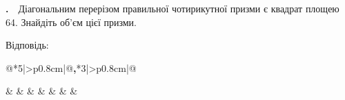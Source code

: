 \documentclass[12pt]{article}
\makeatletter
\newlength{\nmtcellw}
\newcommand{\nmtSetCell}{\setlength{\nmtcellw}{\dimexpr(\linewidth-10\tabcolsep-6\arrayrulewidth)/5\relax}}
\newcommand{\nmtAnswerBox}{%
\par\nopagebreak\vspace{0.2cm}\noindent
Відповідь:\ \
\begin{tabular}{@{}*{4}{|>{\centering\arraybackslash}p{0.8cm}}|@{\hspace{0.1cm}\textbf{,}\hspace{0.1cm}}*{3}{|>{\centering\arraybackslash}p{0.8cm}}|@{}}
\hline
\rule[-0.2cm]{0pt}{0.7cm} & & & & & & \\
\hline
\end{tabular}
\par\vspace{0.3cm}
}
\newcommand{\matchingGrid}{%
    \sbox{\nmtgridbox}{\matchingGridRaw}%
    \ifdim\wd\nmtgridbox>\linewidth \resizebox{\linewidth}{!}{\usebox{\nmtgridbox}}\else\usebox{\nmtgridbox}\fi}
\newcommand{\matchingGridRaw}{%
    \begingroup
    \renewcommand{\arraystretch}{1.15}
    \setlength{\tabcolsep}{4pt}
    \footnotesize
    \begin{tabular}{r|c|c|c|c|c|}
         \multicolumn{1}{c}{} & \multicolumn{1}{c}{\textbf{А}} & \multicolumn{1}{c}{\textbf{Б}} & \multicolumn{1}{c}{\textbf{В}} & \multicolumn{1}{c}{\textbf{Г}} & \multicolumn{1}{c}{\textbf{Д}} \\ \cline{2-6}
         \textbf{1} & \phantom{X} & \phantom{X} & \phantom{X} & \phantom{X} & \phantom{X} \\ \cline{2-6}
         \textbf{2} & & & & & \\ \cline{2-6}
         \textbf{3} & & & & & \\ \cline{2-6}
    \end{tabular}
    \endgroup
}
\newcounter{zad}
\newcommand{\zadnum}{\stepcounter{zad}\textbf{\thezad.}\ \ }
\newcounter{ans}
\newcommand{\nbvspace}[1]{\nopagebreak\vspace{#1}}
\newcommand{\nmtnobreak}{\ifvmode\penalty10000 \fi}
\renewcommand{\nmtAnswerBox}{%
\par\nopagebreak\vspace{0.2cm}\noindent
Відповідь:\ \
\begin{tabular}{@{}*{5}{|>{\centering\arraybackslash}p{0.8cm}}|@{\hspace{0.1cm}\textbf{,}\hspace{0.1cm}}*{3}{|>{\centering\arraybackslash}p{0.8cm}}|@{}}
\hline
\rule[-0.2cm]{0pt}{0.7cm} & & & & & & & \\
\hline
\end{tabular}
\par\vspace{0.3cm}
}
\makeatother
\begin{document}
\providecommand{\trigStyle}[1]{#1}
\providecommand{\answerTableSmall}[5]{%
\begingroup\setlength{\tabcolsep}{2pt}\small\nmtSetCell
\begin{tabular}{|*{5}{>{\centering\arraybackslash}m{\nmtcellw}|}}
\hline
\rule[-0.2cm]{0pt}{0.6cm}\textbf{А} & \textbf{Б} & \textbf{В} & \textbf{Г} & \textbf{Д} \\
\hline
\rule[-0.4cm]{0pt}{0.9cm}#1 & \rule[-0.4cm]{0pt}{0.9cm}#2 & \rule[-0.4cm]{0pt}{0.9cm}#3 & \rule[-0.4cm]{0pt}{0.9cm}#4 & \rule[-0.4cm]{0pt}{0.9cm}#5 \\
\hline
\end{tabular}\endgroup}
\providecommand{\matchingLayout}[3]{%
    \noindent
    \begin{minipage}[t]{0.36\textwidth}\vspace{0pt}\raggedright
        #1
    \end{minipage}%
    \hfill
    \begin{minipage}[t]{0.43\textwidth}\vspace{0pt}\raggedright
        #2
    \end{minipage}%
    \hfill
    \begin{minipage}[t]{0.19\textwidth}
        \vspace{0pt}
        \begin{flushright}
        #3
        \end{flushright}
    \end{minipage}}
\providecommand{\matchingLayoutBottom}[2]{%
    \noindent
    \begin{minipage}[t]{0.48\textwidth}\vspace{0pt}\raggedright
        #1
    \end{minipage}%
    \hfill
    \begin{minipage}[t]{0.48\textwidth}\vspace{0pt}\raggedright
        #2
    \end{minipage}
    \vspace{0.5cm}
    \noindent
    \matchingGrid}
\providecommand{\answerListVertical}[5]{%
    \par\nopagebreak\vspace{0.2cm}
    \begin{itemize}[itemsep=0.4cm, leftmargin=1.5cm, labelsep=0.5cm]
        \item[\textbf{А}] #1
        \item[\textbf{Б}] #2
        \item[\textbf{В}] #3
        \item[\textbf{Г}] #4
        \item[\textbf{Д}] #5
    \end{itemize}
    \vspace{0.2cm}}
\begin{samepage}
\noindent\zadnum Діагональним перерізом правильної чотирикутної призми є квадрат площею 64. Знайдіть об’єм цієї призми.

\nmtnobreak
\nopagebreak\nbvspace{0.5cm}
\nmtAnswerBox
\par{}
\end{samepage}
\endgroup
\end{document}
